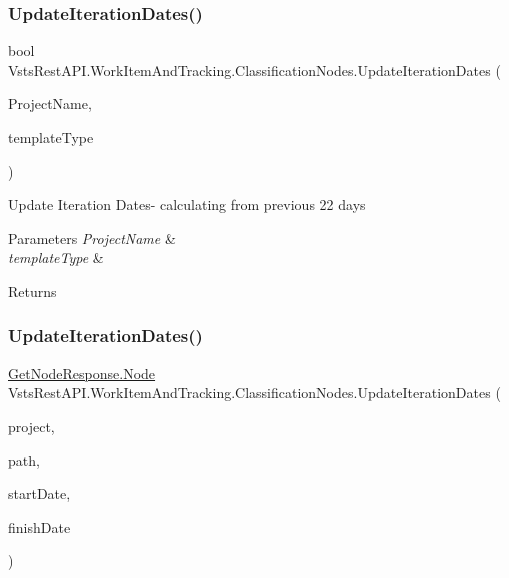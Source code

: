 \subsubsection{\texorpdfstring{Update\+Iteration\+Dates()}{UpdateIterationDates()}\hspace{0.1cm}{\footnotesize\ttfamily [1/2]}}
{\footnotesize\ttfamily bool Vsts\+Rest\+A\+P\+I.\+Work\+Item\+And\+Tracking.\+Classification\+Nodes.\+Update\+Iteration\+Dates (\begin{DoxyParamCaption}\item[{string}]{Project\+Name,  }\item[{string}]{template\+Type }\end{DoxyParamCaption})}



Update Iteration Dates-\/ calculating from previous 22 days 


\begin{DoxyParams}{Parameters}
{\em Project\+Name} & \\
\hline
{\em template\+Type} & \\
\hline
\end{DoxyParams}
\begin{DoxyReturn}{Returns}

\end{DoxyReturn}
\mbox{\label{class_vsts_rest_a_p_i_1_1_work_item_and_tracking_1_1_classification_nodes_a06d5cff8ab9703f58ffa2575abb2cdde}} 
\subsubsection{\texorpdfstring{Update\+Iteration\+Dates()}{UpdateIterationDates()}\hspace{0.1cm}{\footnotesize\ttfamily [2/2]}}
{\footnotesize\ttfamily \mbox{\hyperlink{class_vsts_rest_a_p_i_1_1_viewmodel_1_1_work_item_1_1_get_node_response_1_1_node}{Get\+Node\+Response.\+Node}} Vsts\+Rest\+A\+P\+I.\+Work\+Item\+And\+Tracking.\+Classification\+Nodes.\+Update\+Iteration\+Dates (\begin{DoxyParamCaption}\item[{string}]{project,  }\item[{string}]{path,  }\item[{Date\+Time}]{start\+Date,  }\item[{Date\+Time}]{finish\+Date }\end{DoxyParamCaption})}



